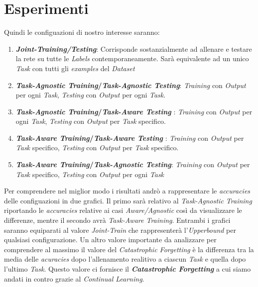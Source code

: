 \section{Esperimenti}
Quindi le configuazioni di nostro interesse saranno:
\begin{enumerate}
     \item \textbf{\textit{Joint-Training/Testing}}: Corrisponde sostanzialmente ad allenare e testare la rete su tutte le \textit{Labels} contemporaneamente. Sarà equivalente ad un unico \textit{Task} con tutti gli \textit{examples} del \textit{Dataset}
    
    \item \textbf{\textit{Task-Agnostic Training}/\textit{Task-Agnostic Testing}}: \textit{Training} con \textit{Output} per ogni \textit{Task}, \textit{Testing} con \textit{Output} per ogni \textit{Task}.  
    
    \item \textbf{ \textit{Task-Agnostic Training}/\textit{Task-Aware Testing}} : \textit{Training} con \textit{Output} per ogni \textit{Task}, \textit{Testing} con \textit{Output} per \textit{Task} specifico.
    
    \item \textbf{\textit{Task-Aware Training}/\textit{Task-Aware Testing}} : \textit{Training} con \textit{Output} per \textit{Task} specifico, \textit{Testing} con \textit{Output} per \textit{Task} specifico. 
    
    \item \textbf{\textit{Task-Aware Training}/\textit{Task-Agnostic Testing}}: \textit{Training} con \textit{Output} per \textit{Task} specifico, \textit{Testing} con \textit{Output} per ogni \textit{Task}  
\end{enumerate}
Per comprendere nel miglior modo i risultati andrò a rappresentare le \textit{accuracies} delle configuazioni in due grafici. Il primo sarà relativo al \textit{Task-Agnostic Training} riportando le \textit{accuracies} relative ai casi \textit{Aware/Agnostic} così da visualizzare le differenze, mentre il secondo avrà \textit{Task-Aware Training}. Entrambi i grafici saranno equiparati al valore \textit{Joint-Train} che rappresenterà l'\textit{Upperbound} per qualsiasi configurazione. \newline
Un altro valore importante da analizzare per comprendere al massimo il valore del \textit{Catastrophic Forgetting} è la differenza tra la media delle \textit{acuracies} dopo l'allenamento realitivo a ciascun \textit{Task} e quella dopo l'ultimo \textit{Task}. Questo valore ci fornisce il \textbf{\textit{Catastrophic Forgetting}} a cui siamo andati in contro grazie al \textit{Continual Learning}.
\newpage
